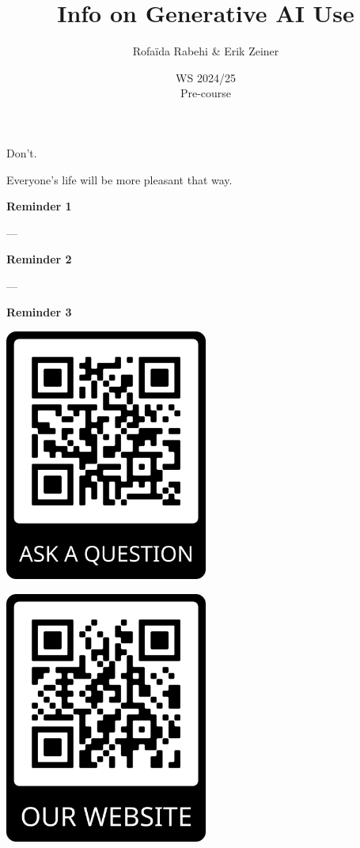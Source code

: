 \documentclass[aspectratio=169,hyperref={unicode}]{beamer}
\title{Info on Generative AI Use}
\author{Rofaïda Rabehi \& Erik Zeiner}
\institute{Fachschaft General \& Computational Linguistics\\ \textbf{University of Tübingen}}
\date{WS 2024/25 \\ Pre-course}
\begin{document}
\frame{\titlepage}


\begin{frame}{}

\begin{center}
	\Huge
	Don't.
\end{center}
Everyone's life will be more pleasant that way.
\end{frame}

\begin{frame}
\begin{center}
\textbf{Reminder 1}

---

\textbf{Reminder 2}

---

\textbf{Reminder 3}

\vspace{1em}

\begin{minipage}{0.4\textwidth}
\centering
    \includegraphics[width=0.5\textwidth]{QRqa.png}
  \end{minipage}
  \hfill
  \begin{minipage}{0.4\textwidth}
  \centering
    \includegraphics[width=0.5\textwidth]{QRweb.png}
  \end{minipage}
\end{center}
\end{frame}
\end{document}
